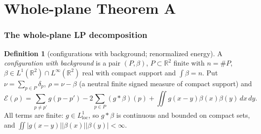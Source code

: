 \documentclass[11pt,reqno]{amsart}
\numberwithin{equation}{section}
\theoremstyle{plain}
\theoremstyle{definition}
\newtheorem{definition}[theorem]{Definition}
\newcommand{\R}{\mathbb{R}}
\newcommand{\cE}{\mathcal{E}}
\begin{document}
\part{Whole-plane Theorem A}

\section{The whole-plane LP decomposition}\label{sec:planedecomp}

\begin{definition}[configurations with background; renormalized energy]\label{def:energy}
A \emph{configuration with background} is a pair $(P,\beta)$, $P\subset\R^2$ finite with $n=\#P$, $\beta\in L^1(\R^2)\cap L^\infty(\R^2)$ real with compact support and $\int\beta=n$.  Put $\nu=\sum_{p\in P}\delta_p$, $\rho=\nu-\beta$ (a neutral finite signed measure of compact support) and
\begin{equation}\label{eq:energy}
\cE(\rho)=\sum_{p\ne p'}g(p-p')-2\sum_{p\in P}(g*\beta)(p)+\iint g(x-y)\beta(x)\beta(y)\,dx\,dy .
\end{equation}
All terms are finite: $g\in L^1_{\mathrm{loc}}$, so $g*\beta$ is continuous and bounded on compact sets, and $\iint|g(x-y)||\beta(x)||\beta(y)|<\infty$.
\end{definition}
\end{document}
